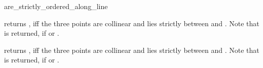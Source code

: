 \begin{ccRefFunction}{are_strictly_ordered_along_line}

         {returns , iff the three points are collinear and 
           lies strictly between  and .
          Note that  is returned, if  or
          .}


         {returns , iff the three points are collinear and 
           lies strictly between  and .
          Note that  is returned, if  or
          .}
\end{ccRefFunction}

